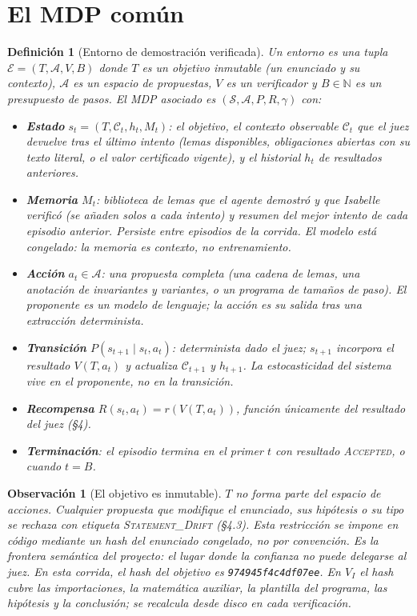 \documentclass[11pt,a4paper]{article}
\newtheorem{definition}{Definición}
\newtheorem{remark}{Observación}
\begin{document}
\section{El MDP común}

\begin{definition}[Entorno de demostración verificada]
Un entorno es una tupla $\mathcal{E} = (T, \mathcal{A}, V, B)$ donde $T$ es un \emph{objetivo} inmutable (un enunciado y su contexto), $\mathcal{A}$ es un espacio de \emph{propuestas}, $V$ es un \emph{verificador} y $B \in \mathbb{N}$ es un presupuesto de pasos. El MDP asociado es $(\mathcal{S}, \mathcal{A}, P, R, \gamma)$ con:
\begin{itemize}
  \item \textbf{Estado} $s_t = (T, \mathcal{C}_t, h_t, M_t)$: el objetivo, el \emph{contexto observable} $\mathcal{C}_t$ que el juez devuelve tras el último intento (lemas disponibles, obligaciones abiertas con su texto literal, o el valor certificado vigente), y el historial $h_t$ de resultados anteriores.
  \item \textbf{Memoria} $M_t$: biblioteca de lemas que el agente demostró y que Isabelle verificó (se añaden solos a cada intento) y resumen del mejor intento de cada episodio anterior. Persiste entre episodios de la corrida. El modelo está congelado: la memoria es contexto, no entrenamiento.
  \item \textbf{Acción} $a_t \in \mathcal{A}$: una propuesta completa (una cadena de lemas, una anotación de invariantes y variantes, o un programa de tamaños de paso). El proponente es un modelo de lenguaje; la acción es su salida tras una extracción determinista.
  \item \textbf{Transición} $P(s_{t+1} \mid s_t, a_t)$: determinista dado el juez; $s_{t+1}$ incorpora el resultado $V(T, a_t)$ y actualiza $\mathcal{C}_{t+1}$ y $h_{t+1}$. La estocasticidad del sistema vive en el proponente, no en la transición.
  \item \textbf{Recompensa} $R(s_t, a_t) = r(V(T, a_t))$, función únicamente del resultado del juez (§4).
  \item \textbf{Terminación}: el episodio termina en el primer $t$ con resultado \textsc{Accepted}, o cuando $t = B$.
\end{itemize}
\end{definition}

\begin{remark}[El objetivo es inmutable]
$T$ no forma parte del espacio de acciones. Cualquier propuesta que modifique el enunciado, sus hipótesis o su tipo se rechaza con etiqueta \textsc{Statement\_Drift} (§4.3). Esta restricción se impone en código mediante un hash del enunciado congelado, no por convención. Es la \emph{frontera semántica} del proyecto: el lugar donde la confianza no puede delegarse al juez.
En esta corrida, el hash del objetivo es \texttt{974945f4c4df07ee}. En $V_I$ el hash cubre las importaciones, la matemática auxiliar, la plantilla del programa, las hipótesis y la conclusión; se recalcula desde disco en cada verificación.
\end{remark}
\end{document}
